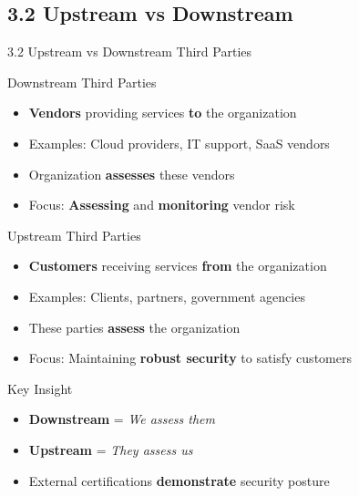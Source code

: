 \documentclass{beamer}
\begin{document}
	\subsection{3.2 Upstream vs Downstream}
	\begin{frame}{3.2 Upstream vs Downstream Third Parties}
		\begin{block}{Downstream Third Parties}
			\begin{itemize}
				\item \textbf{Vendors} providing services \textbf{to} the organization
				\item Examples: Cloud providers, IT support, SaaS vendors
				\item Organization \textbf{assesses} these vendors
				\item Focus: \textbf{Assessing} and \textbf{monitoring} vendor risk
			\end{itemize}
		\end{block}
		
		\begin{block}{Upstream Third Parties}
			\begin{itemize}
				\item \textbf{Customers} receiving services \textbf{from} the organization
				\item Examples: Clients, partners, government agencies
				\item These parties \textbf{assess} the organization
				\item Focus: Maintaining \textbf{robust security} to satisfy customers
			\end{itemize}
		\end{block}
		
		\begin{exampleblock}{Key Insight}
			\begin{itemize}
				\item \textbf{Downstream} = \textit{We assess them}
				\item \textbf{Upstream} = \textit{They assess us}
				\item External certifications \textbf{demonstrate} security posture
			\end{itemize}
		\end{exampleblock}
	\end{frame}
	
\end{document}
